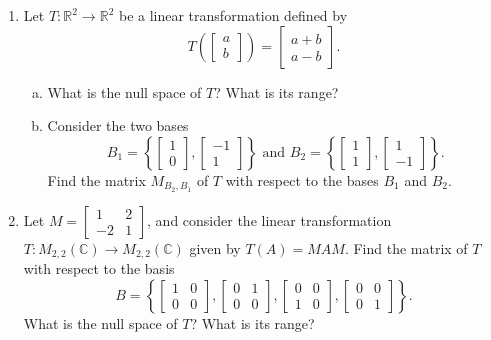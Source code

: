 \documentclass[a4paper,11pt]{article}
\theoremstyle{definition}
\begin{document}
\begin{enumerate}[(1)]
  


\item
  Let $T: \mathbb R^2 \to \mathbb R^2$ be a linear transformation defined by
  \begin{equation*}
    T \left(\begin{bmatrix} a \\ b \end{bmatrix}\right)
    = \begin{bmatrix}a+b \\ a-b \end{bmatrix}.
  \end{equation*}
  \begin{enumerate}[(a)]
  \item
  What is the null space of $T$? What is its range? 
  \item
  Consider the two bases
  \begin{equation*}
    B_1 = \left\{\begin{bmatrix} 1 \\ 0 \end{bmatrix},
      \begin{bmatrix} -1 \\ 1 \end{bmatrix}\right\}
  \text{ and } 
    B_2 = \left\{\begin{bmatrix} 1 \\ 1 \end{bmatrix},
      \begin{bmatrix} 1 \\ -1 \end{bmatrix}\right\}.
  \end{equation*}
  Find the matrix $M_{B_2,B_1}$ of $T$ with respect to the bases $B_1$ and $B_2$.
\end{enumerate}
\item
  Let $M=\begin{bmatrix}1 & 2 \\ -2 & 1 \end{bmatrix}$, and
  consider the linear transformation $T:M_{2,2}(\mathbb C)\to M_{2,2}(\mathbb C)$ given
  by $T(A) = MAM$. Find the matrix of $T$ with respect to the basis
  \begin{equation*}
    B=\left\{
      \begin{bmatrix} 1 & 0 \\ 0 & 0 \end{bmatrix},
      \begin{bmatrix} 0 & 1 \\ 0 & 0 \end{bmatrix},
      \begin{bmatrix} 0 & 0 \\ 1 & 0 \end{bmatrix},
      \begin{bmatrix} 0 & 0 \\ 0 & 1 \end{bmatrix}
    \right\}.
  \end{equation*}
  What is the null space of $T$? What is its range? 



\end{enumerate}
\end{document}
